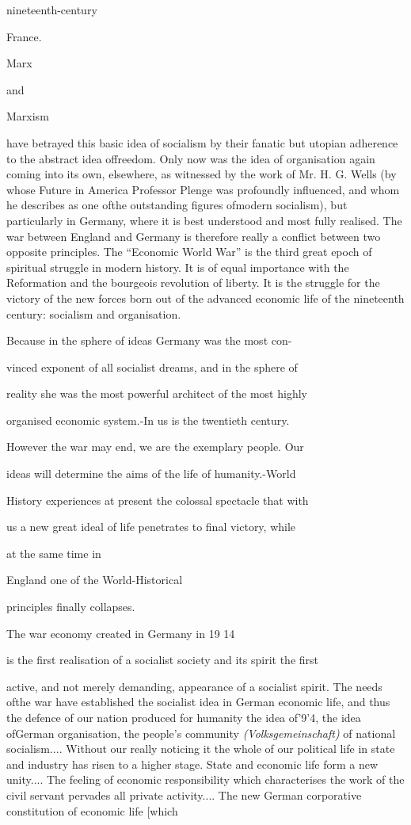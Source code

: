 \documentclass[11pt,openany]{book}
\begin{document}
nineteenth-century

France.

Marx

and

Marxism

have betrayed this basic idea of socialism by their fanatic but utopian adherence to the abstract idea offreedom. Only now was the idea of organisation again coming into its own, elsewhere, as witnessed by the work of Mr. H. G. Wells (by whose Future in America Professor Plenge was profoundly influenced, and whom he describes as one ofthe outstanding figures ofmodern socialism), but particularly in Germany, where it is best understood and most fully realised. The war between England and Germany is therefore really a conflict between two opposite principles. The ``Economic World War'' is the third great epoch of spiritual struggle in modern history. It is of equal importance with the Reformation and the bourgeois revolution of liberty. It is the struggle for the victory of the new forces born out of the advanced economic life of the nineteenth century: socialism and organisation.

Because in the sphere of ideas Germany was the most con-

vinced exponent of all socialist dreams, and in the sphere of

reality she was the most powerful architect of the most highly

organised economic system.-In us is the twentieth century.

However the war may end, we are the exemplary people. Our

ideas will determine the aims of the life of humanity.-World

History experiences at present the colossal spectacle that with

us a new great ideal of life penetrates to final victory, while

at the same time in

England one of the World-Historical

principles finally collapses.

The war economy created in Germany in 19 14

is the first realisation of a socialist society and its spirit the first

active, and not merely demanding, appearance of a socialist spirit. The needs ofthe war have established the socialist idea in German economic life, and thus the defence of our nation produced for humanity the idea of'9'4, the idea ofGerman organisation, the people's community \emph{(Volksgemeinschaft)} of national socialism.... Without our really noticing it the whole of our political life in state and industry has risen to a higher stage. State and economic life form a new unity.... The feeling of economic responsibility which characterises the work of the civil servant pervades all private activity.... The new German corporative constitution of economic life [which
\end{document}
